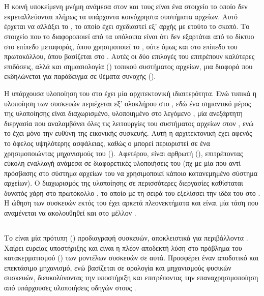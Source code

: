 \section{\viofs{}}
Η κοινή υποκείμενη μνήμη ανάμεσα στον \host{} και τους  είναι ένα
στοιχείο το οποίο δεν εκμεταλλεύονται πλήρως τα υπάρχοντα κοινόχρηστα συστήματα
αρχείων. Αυτό έρχεται να αλλάξει το \viofs{} \cite{virtiofs-website}, το οποίο
έχει σχεδιαστεί εξ' αρχής με ετούτο το σκοπό. Το στοιχείο που το διαφοροποιεί
από τα υπόλοιπα είναι ότι δεν εξαρτάται από το δίκτυο στο επίπεδο μεταφοράς,
όπου χρησιμοποιεί το , ούτε όμως και στο επίπεδο του πρωτοκόλλου,
όπου βασίζεται στο . Αυτές οι δύο επιλογές του επιτρέπουν καλύτερες
επιδόσεις, αλλά και σημασιολογία () τοπικού συστήματος αρχείων,
μια διαφορά που εκδηλώνεται για παράδειγμα σε θέματα συνοχής ().

Η υπάρχουσα υλοποίηση του \viofs{} στο \qemu{} έχει μία αρχιτεκτονική
ιδιαιτερότητα. Ενώ τυπικά η υλοποίηση των συσκευών περιέχεται εξ' ολοκλήρου στο
\qemu{}, εδώ ένα σημαντικό μέρος της υλοποίησης είναι διαχωρισμένο, υλοποιημένο
στο λεγόμενο , μία ανεξάρτητη διεργασία που
αναλαμβάνει όλες τις λειτουργίες του συστήματος αρχείων στον \host{}, ενώ το
\qemu{} έχει μόνο την ευθύνη της εικονικής συσκευής. Αυτή η αρχιτεκτονική
έχει αφενός το όφελος υψηλότερης ασφάλειας, καθώς ο  μπορεί
περιοριστεί σε ένα  χρησιμοποιώντας μηχανισμούς του \host{}
(). Αφετέρου, είναι αρθρωτή (), επιτρέποντας
εύκολη εναλλαγή ανάμεσα σε διαφορετικές υλοποιήσεις του  (πχ με
μία που αντί πρόσβασης στο σύστημα αρχείων του \host{} να χρησιμοποιεί κάποιο
κατανεμημένο σύστημα αρχείων). Ο διαχωρισμός της υλοποίησης σε περισσότερες
διεργασίες καθίσταται δυνατός χάρη στο  πρωτόκολλο
\cite{vhost-user},
το οποίο με τη σειρά του εξελίσσει την ιδέα του  στο \qemu{}
\cite{stefanha:vhost}. Η ώθηση των συσκευών εκτός του  έχει αρκετά
πλεονεκτήματα και είναι μία τάση που αναμένεται να ακολουθηθεί και στο μέλλον
\cite{stefanha:out-of-process-dev}.

\subsection{}
Το  είναι μία πρότυπη () προδιαγραφή συσκευών,
αποκλειστικά για  περιβάλλοντα \cite{virtio}. Χαίρει ευρείας
υποστήριξης και είναι η πλέον αποδεκτή λύση στο πρόβλημα του κατακερματισμού
() των μοντέλων συσκευών σε αυτά. Προσφέρει έναν αποδοτικό και
επεκτάσιμο μηχανισμό, ενώ βασίζεται σε ορολογία και μηχανισμούς φυσικών
συσκευών, διευκολύνοντας την υποστήριξη και επιτρέποντας την επαναχρησιμοποίηση
από υπάρχουσες υλοποιήσεις οδηγών στους .

